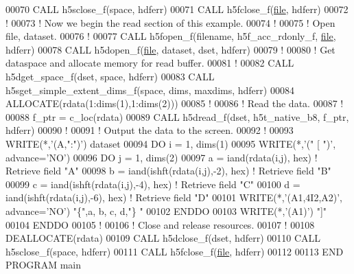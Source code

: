 \begin{DoxyCode}
00070   \textcolor{keyword}{CALL }h5sclose\_f(space, hdferr)
00071   \textcolor{keyword}{CALL }h5fclose\_f(\hyperlink{structfile}{file}, hdferr)
00072   \textcolor{comment}{!}
00073   \textcolor{comment}{! Now we begin the read section of this example. }
00074   \textcolor{comment}{!}
00075   \textcolor{comment}{! Open file, dataset.}
00076   \textcolor{comment}{!}
00077   \textcolor{keyword}{CALL }h5fopen\_f(filename, h5f\_acc\_rdonly\_f, \hyperlink{structfile}{file}, hdferr)
00078   \textcolor{keyword}{CALL }h5dopen\_f(\hyperlink{structfile}{file}, dataset, dset, hdferr)
00079   \textcolor{comment}{!}
00080   \textcolor{comment}{! Get dataspace and allocate memory for read buffer.}
00081   \textcolor{comment}{!}
00082   \textcolor{keyword}{CALL }h5dget\_space\_f(dset, space, hdferr)
00083   \textcolor{keyword}{CALL }h5sget\_simple\_extent\_dims\_f(space, dims, maxdims, hdferr)
00084   \textcolor{keyword}{ALLOCATE}(rdata(1:dims(1),1:dims(2)))
00085   \textcolor{comment}{!}
00086   \textcolor{comment}{! Read the data.}
00087   \textcolor{comment}{!}
00088   f\_ptr = c\_loc(rdata)
00089   \textcolor{keyword}{CALL }h5dread\_f(dset,  h5t\_native\_b8, f\_ptr, hdferr)
00090   \textcolor{comment}{!}
00091   \textcolor{comment}{! Output the data to the screen.}
00092   \textcolor{comment}{!}
00093   \textcolor{keyword}{WRITE}(*,\textcolor{stringliteral}{'(A,":")'}) dataset
00094   \textcolor{keywordflow}{DO} i = 1, dims(1)
00095      \textcolor{keyword}{WRITE}(*,\textcolor{stringliteral}{'(" [ ")'}, advance=\textcolor{stringliteral}{'NO'})
00096      \textcolor{keywordflow}{DO} j = 1, dims(2)
00097         a = iand(rdata(i,j), hex) \textcolor{comment}{! Retrieve field "A"}
00098         b = iand(ishft(rdata(i,j),-2), hex) \textcolor{comment}{! Retrieve field "B"}
00099         c = iand(ishft(rdata(i,j),-4), hex) \textcolor{comment}{! Retrieve field "C"}
00100         d = iand(ishft(rdata(i,j),-6), hex) \textcolor{comment}{! Retrieve field "D"}
00101         \textcolor{keyword}{WRITE}(*,\textcolor{stringliteral}{'(A1,4I2,A2)'}, advance=\textcolor{stringliteral}{'NO'}) \textcolor{stringliteral}{"\{"},a, b, c, d,\textcolor{stringliteral}{"\} "}
00102 \textcolor{keywordflow}{     ENDDO}
00103      \textcolor{keyword}{WRITE}(*,\textcolor{stringliteral}{'(A1)'}) \textcolor{stringliteral}{"]"}
00104 \textcolor{keywordflow}{  ENDDO}
00105   \textcolor{comment}{!}
00106   \textcolor{comment}{! Close and release resources.}
00107   \textcolor{comment}{!}
00108   \textcolor{keyword}{DEALLOCATE}(rdata)
00109   \textcolor{keyword}{CALL }h5dclose\_f(dset, hdferr)
00110   \textcolor{keyword}{CALL }h5sclose\_f(space, hdferr)
00111   \textcolor{keyword}{CALL }h5fclose\_f(\hyperlink{structfile}{file}, hdferr)
00112 
00113 \textcolor{keyword}{END PROGRAM }main
\end{DoxyCode}
